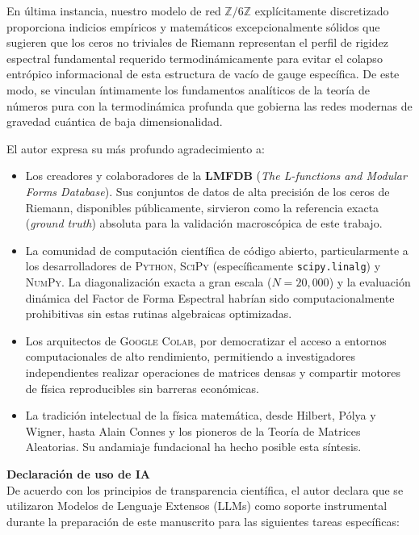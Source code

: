 \documentclass[aps,prl,preprint,superscriptaddress,floatfix]{revtex4-2}
\newcommand{\Zmod}{\mathbb{Z}/6\mathbb{Z}}
\begin{document}
En última instancia, nuestro modelo de red $\Zmod$ explícitamente discretizado proporciona indicios empíricos y matemáticos excepcionalmente sólidos que sugieren que los ceros no triviales de Riemann representan el perfil de rigidez espectral fundamental requerido termodinámicamente para evitar el colapso entrópico informacional de esta estructura de vacío de gauge específica. De este modo, se vinculan íntimamente los fundamentos analíticos de la teoría de números pura con la termodinámica profunda que gobierna las redes modernas de gravedad cuántica de baja dimensionalidad.

\begin{acknowledgments}
El autor expresa su más profundo agradecimiento a:

\begin{itemize}
    \item Los creadores y colaboradores de la \textbf{LMFDB} (\textit{The L-functions and Modular Forms Database}). Sus conjuntos de datos de alta precisión de los ceros de Riemann, disponibles públicamente, sirvieron como la referencia exacta (\textit{ground truth}) absoluta para la validación macroscópica de este trabajo.
    \item La comunidad de computación científica de código abierto, particularmente a los desarrolladores de \textsc{Python}, \textsc{SciPy} (específicamente \texttt{scipy.linalg}) y \textsc{NumPy}. La diagonalización exacta a gran escala ($N=20,000$) y la evaluación dinámica del Factor de Forma Espectral habrían sido computacionalmente prohibitivas sin estas rutinas algebraicas optimizadas.
    \item Los arquitectos de \textsc{Google Colab}, por democratizar el acceso a entornos computacionales de alto rendimiento, permitiendo a investigadores independientes realizar operaciones de matrices densas y compartir motores de física reproducibles sin barreras económicas.
    \item La tradición intelectual de la física matemática, desde Hilbert, Pólya y Wigner, hasta Alain Connes y los pioneros de la Teoría de Matrices Aleatorias. Su andamiaje fundacional ha hecho posible esta síntesis.
\end{itemize}

\vspace{0.3cm}
\noindent \textbf{Declaración de uso de IA} \\
De acuerdo con los principios de transparencia científica, el autor declara que se utilizaron Modelos de Lenguaje Extensos (LLMs) como soporte instrumental durante la preparación de este manuscrito para las siguientes tareas específicas:


\end{acknowledgments}
\end{document}
